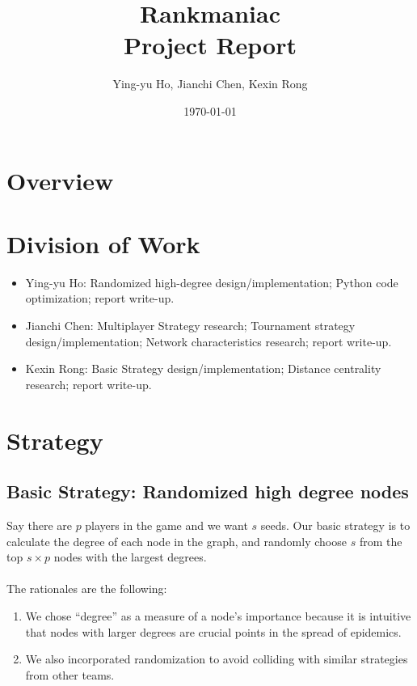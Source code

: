 \documentclass[12pt]{article}
\newcommand{\course}[2]{\def\courseName{#1} \def\sectName{#2}}
\newcommand{\assn}[1]{\def\assnName{#1}}
\begin{document}
\course{Rankmaniac}{}
\assn{Project Report}
\date{\today}
\title{\courseName \sectName \\ \assnName}
\author{Ying-yu Ho, Jianchi Chen, Kexin Rong}
\maketitle

\thispagestyle{empty}

\section{Overview}


\section{Division of Work}
\begin{itemize}
\item Ying-yu Ho: Randomized high-degree design/implementation; Python code optimization; report write-up.
\item Jianchi Chen: Multiplayer Strategy research; Tournament strategy design/implementation; Network characteristics research; report write-up.
\item Kexin Rong: Basic Strategy design/implementation; Distance centrality research; report write-up.
\end{itemize}

\section{Strategy}
\subsection{Basic Strategy: Randomized high degree nodes}
Say there are $p$ players in the game and we want $s$ seeds. Our basic strategy is to calculate the degree of each node in the graph, and randomly choose $s$  from the top $s \times p$ nodes with the largest degrees. \\\\
The rationales are the following: 
\begin{enumerate}
\item We chose ``degree'' as a measure of a node's importance because it is intuitive that nodes with larger degrees are crucial points in the spread of epidemics.
\item We also incorporated randomization to avoid colliding with similar strategies from other teams. 
\end{enumerate}
\end{document}
